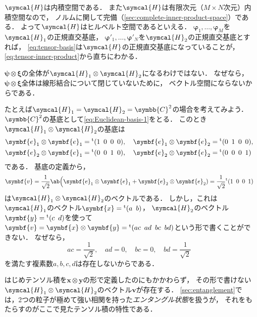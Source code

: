 \documentclass[
]{sotsu}
\newcommand{\bpsi}{\symbf{\psi}}
\newcommand{\bphi}{\symbf{\varphi}}
\newcommand{\bxi}{\symbf{\xi}}
\begin{document}
$\symcal{H}$は内積空間である．
また$\symcal{H}$は有限次元（$M \times N$次元）内積空間なので，
ノルムに関して完備（\cref{sec:complete-inner-product-space}）である．
よって$\symcal{H}$はヒルベルト空間であるといえる．
$\bphi_1, \dots, \bphi_M$を$\symcal{H}_1$の正規直交基底，
$\bphi'_1, \dots, \bphi'_N$を$\symcal{H}_2$の正規直交基底とすれば，
\cref{eq:tensor-basis}は$\symcal{H}$の正規直交基底になっていることが，
\cref{eq:tensor-inner-product}から直ちにわかる．


\bluehead{$\bpsi \otimes \bxi$と書けないテンソル積}\quad 
$\bpsi \otimes \bxi$の全体が$\symcal{H}_1 \otimes \symcal{H}_2$になるわけではない．
なぜなら，
$\bpsi \otimes \bxi$全体は線形結合について閉じていないために，
ベクトル空間にならないからである．

たとえば$\symcal{H}_1 = \symcal{H}_2 = \symbb{C}^2$の場合を考えてみよう．
$\symbb{C}^2$の基底として\cref{eq:Euclidean-basis-1}をとる．
このとき$\symcal{H}_1 \otimes \symcal{H}_2$の基底は
\begin{equation*}
    \begin{split}
        \symbf{e}_1 \otimes \symbf{e}_1 &= \cvector{1 ; 0 ; 0 ; 0},
        \quad 
        \symbf{e}_1 \otimes \symbf{e}_2 = \cvector{0 ; 1 ; 0 ; 0},
        \\
        \symbf{e}_2 \otimes \symbf{e}_1 &= \cvector{0 ; 0 ; 1 ; 0},
        \quad 
        \symbf{e}_2 \otimes \symbf{e}_2 = \cvector{0 ; 0 ; 0 ; 1}
    \end{split}
\end{equation*}
である．
基底の定義から，
\begin{equation*}
    \symbf{v}
    = \frac{1}{\sqrt{2}} \ab\Big( \symbf{e}_1 \otimes \symbf{e}_1 + \symbf{e}_2 \otimes \symbf{e}_2 )
    = \frac{1}{\sqrt{2}} \cvector{1 ; 0 ; 0 ; 1}
\end{equation*}
は$\symcal{H}_1 \otimes \symcal{H}_2$のベクトルである．
しかし，これは$\symcal{H}_1$のベクトル$\symbf{x} = \cvector{a ; b}$，
$\symcal{H}_2$のベクトル$\symbf{y} = \cvector{c ; d}$を使って$\symbf{v} = \symbf{x} \otimes \symbf{y} = \cvector{ac ; ad ; bc ; bd}$という形で書くことができない．
なぜなら，
\begin{equation*}
    ac = \frac{1}{\sqrt{2}}, \quad 
    ad = 0, \quad 
    bc = 0, \quad 
    bd = \frac{1}{\sqrt{2}}
\end{equation*}
を満たす複素数$a, b, c, d$は存在しないからである．

はじめテンソル積を$\symbf{x} \otimes \symbf{y}$の形で定義したのにもかかわらず，
その形で書けない$\symcal{H}_1 \otimes \symcal{H}_2$のベクトル$\symbf{v}$が存在する．
\cref{sec:entanglement}では，2つの粒子が極めて強い相関を持った\emph{エンタングル状態}を扱うが，
それをもたらすのがここで見たテンソル積の特性である．
\end{document}
